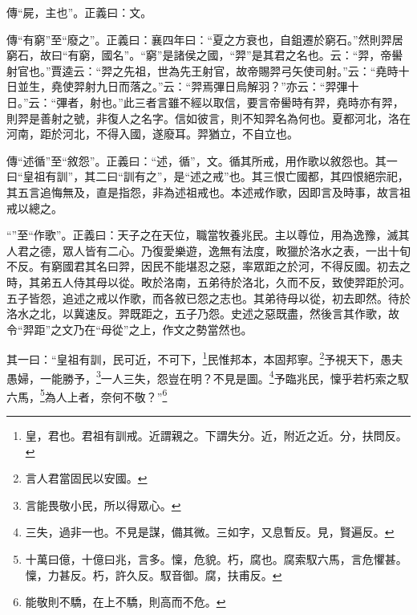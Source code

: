 {\noindent\zhuan{}\fzbyks 傳“屍，主也”。正義曰：文。 \par}

{\noindent\zhuan{}\fzbyks 傳“有窮”至“廢之”。正義曰：襄四年曰：“夏之方衰也，自鉏遷於窮石。”然則羿居窮石，故曰“有窮，國名”。“窮”是諸侯之國，“羿”是其君之名也。云：“羿，帝嚳射官也。”賈逵云：“羿之先祖，世為先王射官，故帝賜羿弓矢使司射。”云：“堯時十日並生，堯使羿射九日而落之。”云：“羿焉彃日烏解羽？”亦云：“羿彃十日。”云：“彃者，射也。”此三者言雖不經以取信，要言帝嚳時有羿，堯時亦有羿，則羿是善射之號，非復人之名字。信如彼言，則不知羿名為何也。夏都河北，洛在河南，距於河北，不得入國，遂廢耳。羿猶立，不自立也。 \par}

{\noindent\zhuan{}\fzbyks 傳“述循”至“敘怨”。正義曰：“述，循”，文。循其所戒，用作歌以敘怨也。其一曰“皇祖有訓”，其二曰“訓有之”，是“述之戒”也。其三恨亡國都，其四恨絕宗祀，其五言追悔無及，直是指怨，非為述祖戒也。本述戒作歌，因即言及時事，故言祖戒以總之。 \par}

{\noindent\shu{}\fzkt “”至“作歌”。正義曰：天子之在天位，職當牧養兆民。主以尊位，用為逸豫，滅其人君之德，眾人皆有二心。乃復愛樂遊，逸無有法度，畋獵於洛水之表，一出十旬不反。有窮國君其名曰羿，因民不能堪忍之惡，率眾距之於河，不得反國。初去之時，其弟五人侍其母以從。畋於洛南，五弟待於洛北，久而不反，致使羿距於河。五子皆怨，追述之戒以作歌，而各敘已怨之志也。其弟待母以從，初去即然。待於洛水之北，以冀速反。羿既距之，五子乃怨。史述之惡既盡，然後言其作歌，故令“羿距”之文乃在“母從”之上，作文之勢當然也。 \par}

其一曰：“皇祖有訓，民可近，不可下，\footnote{皇，君也。君祖有訓戒。近謂親之。下謂失分。近，附近之近。分，扶問反。}民惟邦本，本固邦寧。\footnote{言人君當固民以安國。}予視天下，愚夫愚婦，一能勝予，\footnote{言能畏敬小民，所以得眾心。}一人三失，怨豈在明？不見是圖。\footnote{三失，過非一也。不見是謀，備其微。三如字，又息暫反。見，賢遍反。}予臨兆民，懍乎若朽索之馭六馬，\footnote{十萬曰億，十億曰兆，言多。懍，危貌。朽，腐也。腐索馭六馬，言危懼甚。懍，力甚反。朽，許久反。馭音御。腐，扶甫反。}為人上者，奈何不敬？”\footnote{能敬則不驕，在上不驕，則高而不危。}


